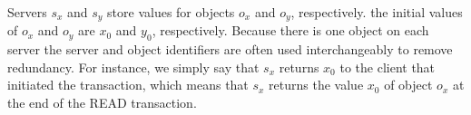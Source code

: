 Servers $s_x$ and $s_y$ store values for objects $o_x$ and $o_y$, respectively.
the initial values of $o_x$ and $o_y$ are $x_0$ and $y_0$, respectively. Because there is one  object on each server  the server and object identifiers are often used interchangeably to remove redundancy. For instance, we simply say that $s_x$ returns $x_0$ to the client that initiated the transaction, which means that $s_x$ returns the value $x_0$ of object $o_x$ at the end of the READ transaction.  
%

